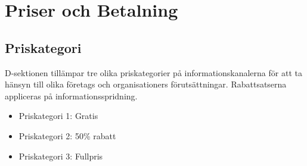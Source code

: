 \documentclass{dsekprotokoll}
\begin{document}
\section{Priser och Betalning}

\subsection{Priskategori}

D-sektionen tillämpar tre olika priskategorier på informationskanalerna för att ta hänsyn till olika företags och organisationers förutsättningar.
Rabattsatserna appliceras på informationsspridning.

\begin{itemize}
    \item Priskategori 1: Gratis
    \item Priskategori 2: 50\% rabatt
    \item Priskategori 3: Fullpris
\end{itemize}
\end{document}
